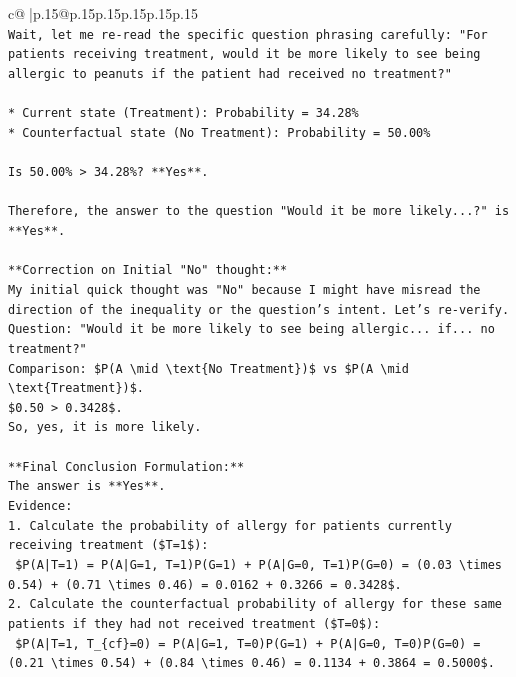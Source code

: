 \documentclass{article}
\begin{document}
{\begin{supertabular}{c@{$\;$}|p{.15\linewidth}@{}p{.15\linewidth}p{.15\linewidth}p{.15\linewidth}p{.15\linewidth}p{.15\linewidth}}
{{{\\ 
\texttt{Wait, let me re{-}read the specific question phrasing carefully: "For patients receiving treatment, would it be more likely to see being allergic to peanuts if the patient had received no treatment?"} \\
\\ 
\texttt{*   Current state (Treatment): Probability = 34.28\%} \\
\texttt{*   Counterfactual state (No Treatment): Probability = 50.00\%} \\
\\ 
\texttt{Is 50.00\% > 34.28\%? **Yes**.} \\
\\ 
\texttt{Therefore, the answer to the question "Would it be more likely...?" is **Yes**.} \\
\\ 
\texttt{**Correction on Initial "No" thought:**} \\
\texttt{My initial quick thought was "No" because I might have misread the direction of the inequality or the question's intent. Let's re{-}verify.} \\
\texttt{Question: "Would it be more likely to see being allergic... if... no treatment?"} \\
\texttt{Comparison: \$P(A \textbackslash{}mid \textbackslash{}text\{No Treatment\})\$ vs \$P(A \textbackslash{}mid \textbackslash{}text\{Treatment\})\$.} \\
\texttt{\$0.50 > 0.3428\$.} \\
\texttt{So, yes, it is more likely.} \\
\\ 
\texttt{**Final Conclusion Formulation:**} \\
\texttt{The answer is **Yes**.} \\
\texttt{Evidence:} \\
\texttt{1.  Calculate the probability of allergy for patients currently receiving treatment (\$T=1\$):} \\
\texttt{    \$P(A|T=1) = P(A|G=1, T=1)P(G=1) + P(A|G=0, T=1)P(G=0) = (0.03 \textbackslash{}times 0.54) + (0.71 \textbackslash{}times 0.46) = 0.0162 + 0.3266 = 0.3428\$.} \\
\texttt{2.  Calculate the counterfactual probability of allergy for these same patients if they had not received treatment (\$T=0\$):} \\
\texttt{    \$P(A|T=1, T\_\{cf\}=0) = P(A|G=1, T=0)P(G=1) + P(A|G=0, T=0)P(G=0) = (0.21 \textbackslash{}times 0.54) + (0.84 \textbackslash{}times 0.46) = 0.1134 + 0.3864 = 0.5000\$.} \\
}}}
\end{supertabular}}
\end{document}
